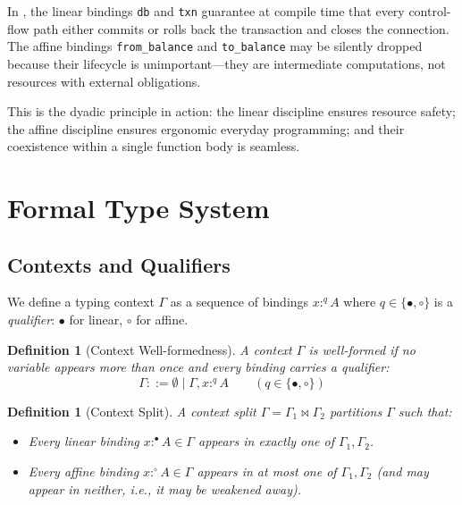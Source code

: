 \documentclass[11pt,a4paper]{article}
\newtheorem{definition}[theorem]{Definition}
\newcommand{\lmark}{\bullet}  %
\newcommand{\amark}{\circ}    %
\newcommand{\ctx}{\Gamma}
\begin{document}
In , the linear bindings \lstinline{db} and \lstinline{txn}
guarantee at compile time that every control-flow path either commits or rolls
back the transaction and closes the connection. The affine bindings
\lstinline{from_balance} and \lstinline{to_balance} may be silently dropped
because their lifecycle is unimportant---they are intermediate computations,
not resources with external obligations.

This is the dyadic principle in action: the linear discipline ensures resource
safety; the affine discipline ensures ergonomic everyday programming; and their
coexistence within a single function body is seamless.

\section{Formal Type System}
\label{sec:formal-type-system}

\subsection{Contexts and Qualifiers}

We define a typing context $\ctx$ as a sequence of bindings $x :^q A$ where
$q \in \{\lmark, \amark\}$ is a \emph{qualifier}: $\lmark$ for linear, $\amark$
for affine.

\begin{definition}[Context Well-formedness]
A context $\ctx$ is \emph{well-formed} if no variable appears more than once
and every binding carries a qualifier:
\[
  \ctx ::= \emptyset \mid \ctx, x :^q A \qquad (q \in \{\lmark, \amark\})
\]
\end{definition}

\begin{definition}[Context Split]
A context split $\ctx = \ctx_1 \bowtie \ctx_2$ partitions $\ctx$ such that:
\begin{itemize}
  \item Every linear binding $x :^\lmark A \in \ctx$ appears in exactly one of
    $\ctx_1, \ctx_2$.
  \item Every affine binding $x :^\amark A \in \ctx$ appears in at most one of
    $\ctx_1, \ctx_2$ (and may appear in neither, i.e., it may be weakened away).
\end{itemize}
\end{definition}
\end{document}
